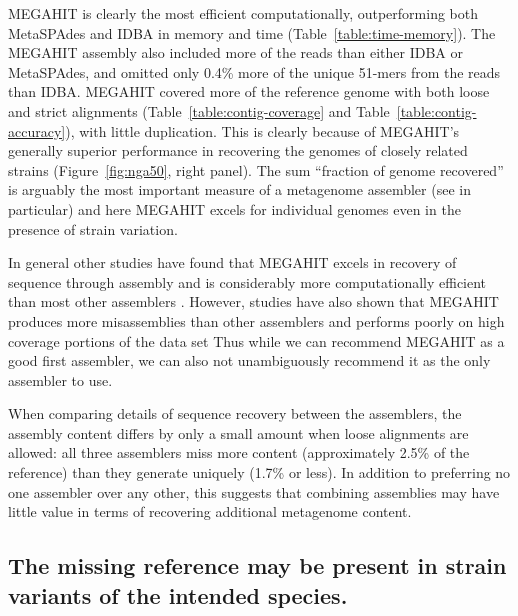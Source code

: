 \documentclass[11pt]{article}
\begin{document}
MEGAHIT is clearly the most efficient computationally, outperforming
both MetaSPAdes and IDBA in memory and time
(Table~\ref{table:time-memory}).  The MEGAHIT assembly also included
more of the reads than either IDBA or MetaSPAdes, and omitted only
0.4\% more of the unique 51-mers from the reads than IDBA.  MEGAHIT
covered more of the reference genome with both loose and strict
alignments (Table~\ref{table:contig-coverage} and
Table~\ref{table:contig-accuracy}), with little duplication.  This is
clearly because of MEGAHIT's generally superior performance in
recovering the genomes of closely related strains
(Figure~\ref{fig:nga50}, right panel).  The sum ``fraction of genome
recovered'' is arguably the most important measure of a metagenome
assembler (see \cite{Vollmers2017} in particular) and here MEGAHIT
excels for individual genomes even in the presence of strain
variation.

In general other studies have found that MEGAHIT excels in recovery of
sequence through assembly \cite{CAMI,Greenwald2017} and is
considerably more computationally efficient than most other assemblers
\cite{CAMI,metag_one}.  However, studies have also shown that MEGAHIT
produces more misassemblies than other assemblers \cite{CAMI} and
performs poorly on high coverage portions of the data set
\cite{Vollmers2017} Thus while we can recommend MEGAHIT as a good
first assembler, we can also not unambiguously recommend it as the only
assembler to use.


When comparing details of sequence recovery between the assemblers,
the assembly content differs by only a small amount when loose
alignments are allowed: all three assemblers miss more content
(approximately 2.5\% of the reference) than they generate uniquely
(1.7\% or less).  In addition to preferring no one assembler over any
other, this suggests that combining assemblies may have little value
in terms of recovering additional metagenome content.

\subsection*{The missing reference may be present in strain variants of the intended species.}
\end{document}
